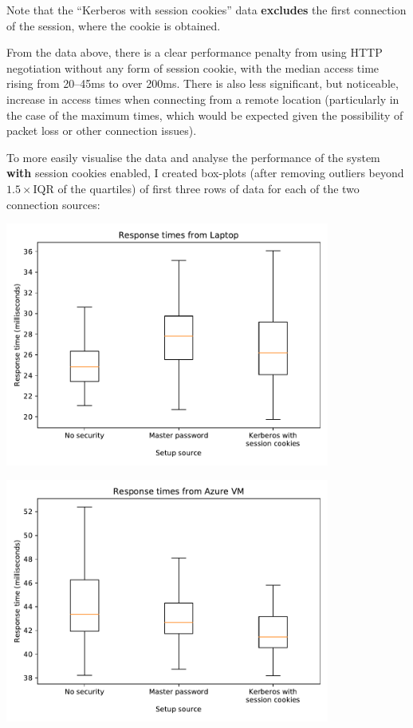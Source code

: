 \documentclass[12pt]{report}
\begin{document}
Note that the ``Kerberos with session cookies'' data \textbf{excludes} the first connection of the session, where the cookie is obtained.

From the data above, there is a clear performance penalty from using HTTP negotiation without any form of session cookie, with the median access time rising from 20--45ms to over 200ms. There is also less significant, but noticeable, increase in access times when connecting from a remote location (particularly in the case of the maximum times, which would be expected given the possibility of packet loss or other connection issues).

To more easily visualise the data and analyse the performance of the system \textbf{with} session cookies enabled, I created box-plots (after removing outliers beyond $1.5 \times \mathrm{IQR}$ of the quartiles) of first three rows of data for each of the two connection sources:

\begin{center}
  \includegraphics[width=0.8\textwidth]{11-response-times-laptop.pdf}
\end{center}

\begin{center}
  \includegraphics[width=0.8\textwidth]{12-response-times-azure.pdf}
\end{center}
\end{document}
